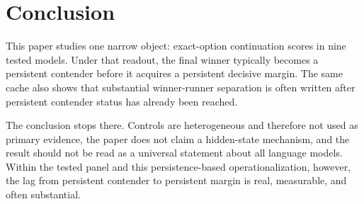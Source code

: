 \section{Conclusion}

This paper studies one narrow object: exact-option continuation scores in nine tested models. Under that readout, the final winner typically becomes a persistent contender before it acquires a persistent decisive margin. The same cache also shows that substantial winner-runner separation is often written after persistent contender status has already been reached.

The conclusion stops there. Controls are heterogeneous and therefore not used as primary evidence, the paper does not claim a hidden-state mechanism, and the result should not be read as a universal statement about all language models. Within the tested panel and this persistence-based operationalization, however, the lag from persistent contender to persistent margin is real, measurable, and often substantial.
